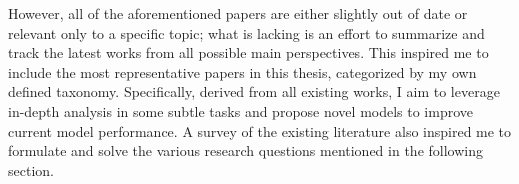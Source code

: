 However, all of the aforementioned papers are either slightly out of date or relevant only to a specific topic; what is lacking is an effort to summarize and track the latest works from all possible main perspectives. This inspired me to include the most representative papers in this thesis, categorized by my own defined taxonomy. Specifically, derived from all existing works, I aim to leverage in-depth analysis in some subtle tasks and propose novel models to improve current model performance. A survey of the existing literature also inspired me to formulate and solve the various research questions mentioned in the following section.